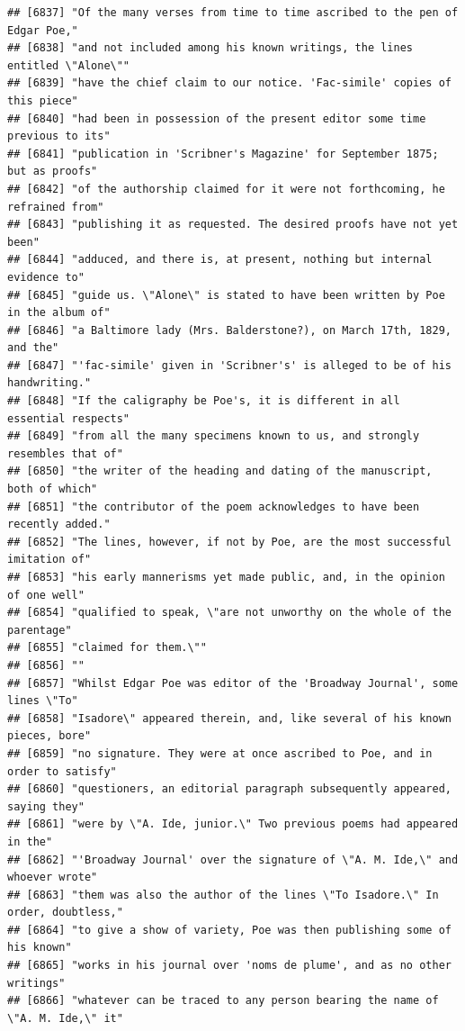 \documentclass{article}\usepackage[]{graphicx}\usepackage[]{color}
\makeatletter
\newenvironment{kframe}{%
 \def\at@end@of@kframe{}%
 \ifinner\ifhmode%
  \def\at@end@of@kframe{\end{minipage}}%
  \begin{minipage}{\columnwidth}%
 \fi\fi%
 \def\FrameCommand##1{\hskip\@totalleftmargin \hskip-\fboxsep
 \colorbox{shadecolor}{##1}\hskip-\fboxsep
     \hskip-\linewidth \hskip-\@totalleftmargin \hskip\columnwidth}%
 \MakeFramed {\advance\hsize-\width
   \@totalleftmargin\z@ \linewidth\hsize
   \@setminipage}}%
 {\par\unskip\endMakeFramed%
 \at@end@of@kframe}
\newenvironment{knitrout}{}{} %
\makeatother
\begin{document}
\begin{knitrout}
\begin{kframe}
\begin{verbatim}
## [6837] "Of the many verses from time to time ascribed to the pen of Edgar Poe,"      
## [6838] "and not included among his known writings, the lines entitled \"Alone\""     
## [6839] "have the chief claim to our notice. 'Fac-simile' copies of this piece"       
## [6840] "had been in possession of the present editor some time previous to its"      
## [6841] "publication in 'Scribner's Magazine' for September 1875; but as proofs"      
## [6842] "of the authorship claimed for it were not forthcoming, he refrained from"    
## [6843] "publishing it as requested. The desired proofs have not yet been"            
## [6844] "adduced, and there is, at present, nothing but internal evidence to"         
## [6845] "guide us. \"Alone\" is stated to have been written by Poe in the album of"   
## [6846] "a Baltimore lady (Mrs. Balderstone?), on March 17th, 1829, and the"          
## [6847] "'fac-simile' given in 'Scribner's' is alleged to be of his handwriting."     
## [6848] "If the caligraphy be Poe's, it is different in all essential respects"       
## [6849] "from all the many specimens known to us, and strongly resembles that of"     
## [6850] "the writer of the heading and dating of the manuscript, both of which"       
## [6851] "the contributor of the poem acknowledges to have been recently added."       
## [6852] "The lines, however, if not by Poe, are the most successful imitation of"     
## [6853] "his early mannerisms yet made public, and, in the opinion of one well"       
## [6854] "qualified to speak, \"are not unworthy on the whole of the parentage"        
## [6855] "claimed for them.\""                                                         
## [6856] ""                                                                            
## [6857] "Whilst Edgar Poe was editor of the 'Broadway Journal', some lines \"To"      
## [6858] "Isadore\" appeared therein, and, like several of his known pieces, bore"     
## [6859] "no signature. They were at once ascribed to Poe, and in order to satisfy"    
## [6860] "questioners, an editorial paragraph subsequently appeared, saying they"      
## [6861] "were by \"A. Ide, junior.\" Two previous poems had appeared in the"          
## [6862] "'Broadway Journal' over the signature of \"A. M. Ide,\" and whoever wrote"   
## [6863] "them was also the author of the lines \"To Isadore.\" In order, doubtless,"  
## [6864] "to give a show of variety, Poe was then publishing some of his known"        
## [6865] "works in his journal over 'noms de plume', and as no other writings"         
## [6866] "whatever can be traced to any person bearing the name of \"A. M. Ide,\" it"  

\end{verbatim}
\end{kframe}
\end{knitrout}
\end{document}
